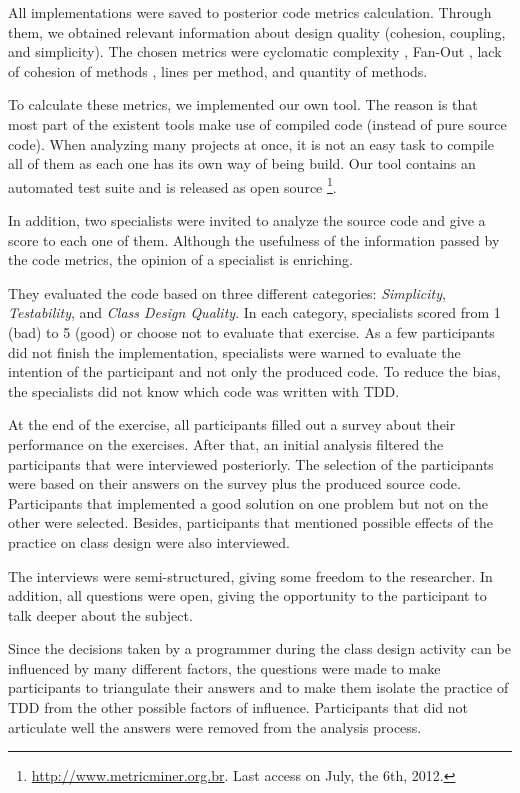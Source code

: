 \documentclass[times]{speauth}
\begin{document}
All implementations were saved to posterior code metrics calculation.
Through them, we obtained relevant information about design quality (cohesion, 
coupling, and simplicity). The chosen metrics were cyclomatic complexity \cite{mccabe},
Fan-Out \cite{lorenz}, lack of cohesion of methods \cite{lcom-hs}, lines per method,
and quantity of methods.

To calculate these metrics, we implemented our own tool. The reason is that
most part of the existent tools make use of compiled code (instead of pure source
code). When analyzing many projects at once, it is not an easy task to compile all
of them as each one has its own way of being build.
Our tool contains an automated test suite and is released as open source
\footnote{\url{http://www.metricminer.org.br}. 
Last access on July, the 6th, 2012.}.

In addition, two specialists were invited to analyze the source code and give a score
to each one of them. Although the usefulness of the information passed by the code metrics,
the opinion of a specialist is enriching.

They evaluated the code based on three different categories: \textit{Simplicity}, \textit{Testability},
and \textit{Class Design Quality}. In each category, specialists scored from 1 (bad) to
5 (good) or choose not to evaluate that exercise. As a few participants did not finish the
implementation, specialists were warned to evaluate the intention of the participant and not
only the produced code.
To reduce the bias, the specialists did not know which code was written with TDD.

At the end of the exercise, all participants filled out a survey about their performance
on the exercises. After that, an initial analysis filtered the participants that
were interviewed posteriorly. The selection of the participants were based on
their answers on the survey plus the produced source code. Participants that implemented
a good solution on one problem but not on the other were selected. Besides, participants
that mentioned possible effects of the practice on class design were also interviewed.

The interviews were semi-structured, giving some freedom to the researcher. 
In addition, all questions were open, giving the
opportunity to the participant to talk deeper about the subject.

Since the decisions taken by a programmer during the class design activity can be
influenced by many different factors, the questions were made to make participants
to triangulate their answers and to make them isolate the practice of TDD from
the other possible factors of influence. Participants that did not articulate well
the answers were removed from the analysis process.
\end{document}
